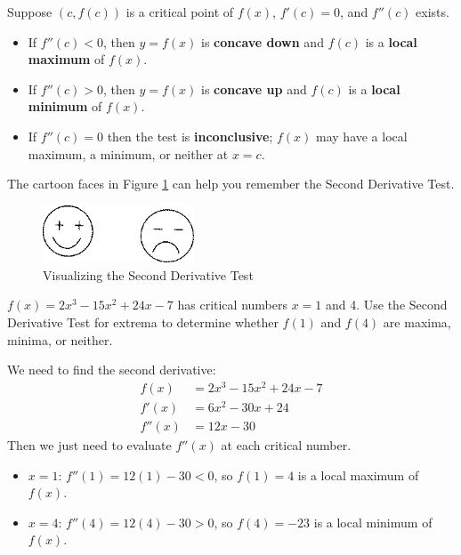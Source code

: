 \begin{theorem}
Suppose $(c, f(c))$ is a critical point of $f(x)$, $f'(c)=0$, and $f''(c)$ exists.
    \begin{itemize}
    \item If $f''(c)<0$, then $y=f(x)$ is {\bf concave down} and $f(c)$ is a {\bf local maximum} of $f(x)$.
    \item If $f''(c)>0$, then $y=f(x)$ is {\bf concave up} and $f(c)$ is a {\bf local minimum} of $f(x)$.
    \item If $f''(c)=0$ then the test is {\bf inconclusive}; $f(x)$ may have a local maximum, a minimum, or neither at $x=c$.
    \end{itemize}
\end{theorem}
The cartoon faces in Figure \ref{fig:3-4-2derivtest} can help you remember the Second Derivative Test.

\begin{figure}[!ht]
  \centering
    \includegraphics[width=0.4\textwidth]{img/chap3/image063.png}
    \caption{Visualizing the Second Derivative Test}
    \label{fig:3-4-2derivtest}
\end{figure}

\begin{example}
$f(x)=2x^3-15x^2+24x-7$ has critical numbers $x= 1$ and 4. Use the Second Derivative Test for extrema to determine whether $f(1)$ and $f(4)$ are maxima, minima, or neither.

\begin{solution} We need to find the second derivative:
\begin{align*}
		f(x) &= 2x^3 - 15x^2 + 24x - 7\\
		f'(x) &= 6x^2 - 30x + 24\\
		f''(x) &= 12x - 30
	\end{align*}
Then we just need to evaluate $f''(x)$ at each critical number.
    \begin{itemize}[label={}]
    \item $x=1$: $f''(1)=12(1)-30<0$, so $f(1)=4$ is a local maximum of $f(x)$.
    \item $x=4$: $f''(4)=12(4)-30>0$, so $f(4)=-23$ is a local minimum of $f(x)$.
    \end{itemize}
\end{solution}
\end{example}

